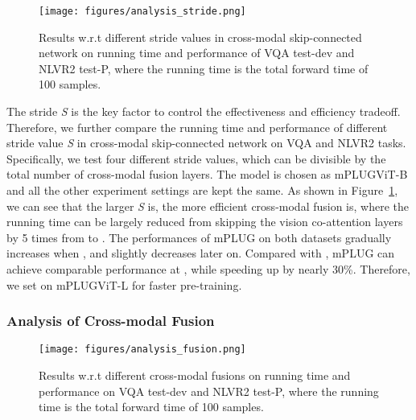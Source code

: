 \documentclass[11pt]{article}
\newcommand{\modelname}{mPLUG }
\begin{document}
\begin{figure}[t]
     \centering
     \texttt{[image: figures/analysis\_stride.png]}
     \caption{Results w.r.t different stride values  in cross-modal skip-connected network on running time and performance of VQA test-dev and NLVR2 test-P, where the running time is the total forward time of 100 samples.}
     \label{fig:analysis_stride}
\end{figure}

The stride \emph{S} is the key factor to control the effectiveness and efficiency tradeoff. Therefore, we further compare the running time and performance of different stride value \emph{S} in cross-modal skip-connected network on VQA and NLVR2 tasks. Specifically, we test four different stride values, which can be divisible by the total number of cross-modal fusion layers. The model is chosen as mPLUG{\tiny{ViT-B}} and all the other experiment settings are kept the same. As shown in Figure~\ref{fig:analysis_stride}, we can see that the larger \emph{S} is, the more efficient cross-modal fusion is, where the running time can be largely reduced from skipping the vision co-attention layers by 5 times from  to . The performances of \modelname on both datasets gradually increases when , and slightly decreases later on. Compared with ,  \modelname can achieve comparable performance at , while speeding up by nearly 30\%. Therefore, we set  on mPLUG{\tiny{ViT-L}} for faster pre-training.



\subsubsection{Analysis of Cross-modal Fusion}

\begin{figure}[t]
     \centering
     \texttt{[image: figures/analysis\_fusion.png]}
     \caption{Results w.r.t different cross-modal fusions on running time and performance on VQA test-dev and NLVR2 test-P, where the running time is the total forward time of 100 samples.}
     \label{fig:analysis_fusion}
\end{figure}
\end{document}
